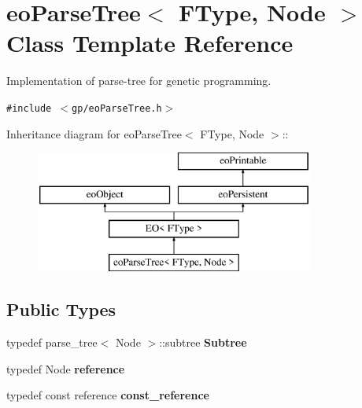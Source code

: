 \section{eo\-Parse\-Tree$<$ FType, Node $>$ Class Template Reference}
\label{classeo_parse_tree}
Implementation of parse-tree for genetic programming.  


{\tt \#include $<$gp/eo\-Parse\-Tree.h$>$}

Inheritance diagram for eo\-Parse\-Tree$<$ FType, Node $>$::\begin{figure}[H]
\begin{center}
\leavevmode
\includegraphics[height=4cm]{classeo_parse_tree}
\end{center}
\end{figure}
\subsection*{Public Types}
\begin{CompactItemize}
\item 
typedef parse\_\-tree$<$ Node $>$::subtree {\bf Subtree}\label{classeo_parse_tree_w0}

\item 
typedef Node {\bf reference}\label{classeo_parse_tree_w1}

\item 
typedef const reference {\bf const\_\-reference}\label{classeo_parse_tree_w2}

\end{CompactItemize}

